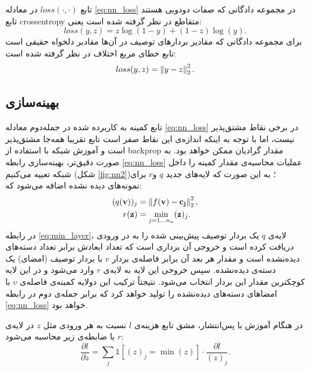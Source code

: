  تابع $loss(\cdot, \cdot)$ در معادله \eqref{eq:nn_loss} در مجموعه دادگانی که صفات دودویی هستند تابع \gls{crossentropy} متقاطع در نظر گرفته شده است یعنی:
 \begin{equation}
 loss(y,z) = z \log(1-y) + (1-z) \log(y).
 \end{equation}
 برای مجموعه دادگانی که مقادیر بردارهای توصیف در آن‌ها مقادیر دلخواه حقیقی است تابع خطای مربع اختلاف در نظر گرفته شده است:
 \begin{equation}
 loss(y,z) = \left \lVert y-z \right \rVert_2^2.
 \end{equation}
 \subsection{بهینه‌سازی }\label{opt_nn}

 تابع کمینه به کاربرده شده در جمله‌دوم معادله
\eqref{eq:nn_loss}
در برخی نقاط مشتق‌پذیر نیست، اما با توجه به اینکه اندازه‌ی این نقاط صفر است تابع تقریبا همه‌جا مشتق‌پذیر است و آموزش شبکه با استفاده از \gls{backprop}
 مقدار گرادیان ممکن خواهد بود. به صورت دقیق‌تر، بهینه‌سازی رابطه \eqref{eq:nn_loss} عملیات محاسبه‌ی مقدار کمینه را داخل شبکه تعبیه می‌کنیم (شکل \ref{fig:nn2})؛ به این صورت که لایه‌های جدید $q$ و$r$ برای نمونه‌های دیده نشده اضافه می‌شود که:
\begin{align}
\label{eq:min_layer}
(q(\mathbf{v}))_j &=  \left \lVert f(\mathbf{v) - c_j} \right \rVert_2^2, \\
r(\mathbf{z}) &= \min_{j=1\ldots n_u} (\mathbf{z})_j.
\end{align}
در رابطه \eqref{eq:min_layer}، لایه‌ی $q$ یک بردار توصیف پیش‌بینی شده را به در ورودی دریافت کرده است و خروجی آن برداری است که تعداد ابعادش برابر تعداد دسته‌های دیده‌نشده است و مقدار هر بعد آن برابر فاصله‌ی بردار $v$ با بردار توصیف (امضای) یک دسته‌ی دیده‌نشده. سپس خروجی این لایه به لایه‌ی $r$ وارد می‌شود و در این لایه کوچکترین مقدار این بردار انتخاب می‌شود. نتیجتاً ترکیب این دولایه کمینه‌ی فاصله‌ی $v$ با امضاهای دسته‌های دیده‌نشده را تولید خواهد کرد که برابر جمله‌ی دوم در رابطه \eqref{eq:nn_loss} خواهد بود.

در هنگام آموزش با پس‌انتشار، مشق تابع هزینه‌ی $l$ نسبت به هر ورودی مثل $z$ در لایه‌ی $r$ با ضابطه‌ی زیر محاسبه می‌شود:
\begin{equation}
\label{eq:grad_min}
\frac{\partial l}{\partial z} = \sum_j \mathds{1}[(z)_j=\min(z)] \cdot \frac{\partial l}{(z)_j}.
\end{equation}

